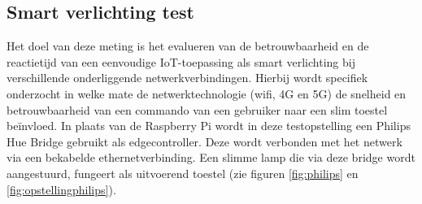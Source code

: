\subsection{Smart verlichting test}
Het doel van deze meting is het evalueren van de betrouwbaarheid en de reactietijd van een eenvoudige IoT-toepassing als smart verlichting bij verschillende onderliggende netwerkverbindingen.
Hierbij wordt specifiek onderzocht in welke mate de netwerktechnologie (wifi, 4G en 5G) de snelheid en betrouwbaarheid van een commando van een gebruiker naar een slim toestel beïnvloed.
In plaats van de Raspberry Pi wordt in deze testopstelling een Philips Hue Bridge gebruikt als edgecontroller. Deze wordt verbonden met het netwerk via een bekabelde ethernetverbinding. Een slimme lamp die via deze bridge wordt aangestuurd, fungeert als uitvoerend toestel (zie figuren \ref{fig:philips} en \ref{fig:opstellingphilips}). 

